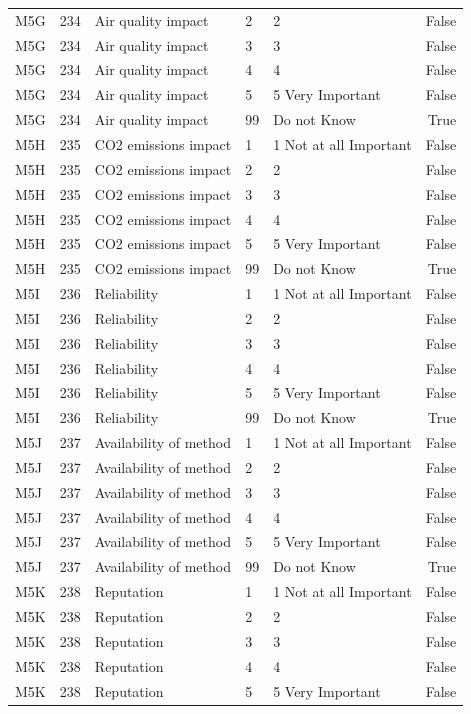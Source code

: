 \begin{tabular}{lrlllr}
M5G & 234 & Air quality impact & 2 & 2 & False \\
M5G & 234 & Air quality impact & 3 & 3 & False \\
M5G & 234 & Air quality impact & 4 & 4 & False \\
M5G & 234 & Air quality impact & 5 & 5 Very Important & False \\
M5G & 234 & Air quality impact & 99 & Do not Know & True \\
M5H & 235 & CO2 emissions impact & 1 & 1 Not at all Important & False \\
M5H & 235 & CO2 emissions impact & 2 & 2 & False \\
M5H & 235 & CO2 emissions impact & 3 & 3 & False \\
M5H & 235 & CO2 emissions impact & 4 & 4 & False \\
M5H & 235 & CO2 emissions impact & 5 & 5 Very Important & False \\
M5H & 235 & CO2 emissions impact & 99 & Do not Know & True \\
M5I & 236 & Reliability & 1 & 1 Not at all Important & False \\
M5I & 236 & Reliability & 2 & 2 & False \\
M5I & 236 & Reliability & 3 & 3 & False \\
M5I & 236 & Reliability & 4 & 4 & False \\
M5I & 236 & Reliability & 5 & 5 Very Important & False \\
M5I & 236 & Reliability & 99 & Do not Know & True \\
M5J & 237 & Availability of method & 1 & 1 Not at all Important & False \\
M5J & 237 & Availability of method & 2 & 2 & False \\
M5J & 237 & Availability of method & 3 & 3 & False \\
M5J & 237 & Availability of method & 4 & 4 & False \\
M5J & 237 & Availability of method & 5 & 5 Very Important & False \\
M5J & 237 & Availability of method & 99 & Do not Know & True \\
M5K & 238 & Reputation & 1 & 1 Not at all Important & False \\
M5K & 238 & Reputation & 2 & 2 & False \\
M5K & 238 & Reputation & 3 & 3 & False \\
M5K & 238 & Reputation & 4 & 4 & False \\
M5K & 238 & Reputation & 5 & 5 Very Important & False \\

\end{tabular}
